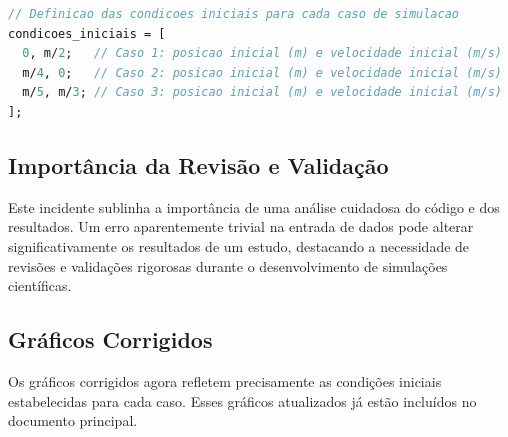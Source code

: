 \documentclass{article}
\begin{document}
\begin{lstlisting}[language=Scilab, caption=Condições iniciais corrigidas]
// Definicao das condicoes iniciais para cada caso de simulacao
condicoes_iniciais = [
  0, m/2;   // Caso 1: posicao inicial (m) e velocidade inicial (m/s)
  m/4, 0;   // Caso 2: posicao inicial (m) e velocidade inicial (m/s)
  m/5, m/3; // Caso 3: posicao inicial (m) e velocidade inicial (m/s)
];
\end{lstlisting}

\subsection{Importância da Revisão e Validação}

Este incidente sublinha a importância de uma análise cuidadosa do código e dos resultados. Um erro aparentemente trivial na entrada de dados pode alterar significativamente os resultados de um estudo, destacando a necessidade de revisões e validações rigorosas durante o desenvolvimento de simulações científicas.

\subsection{Gráficos Corrigidos}

Os gráficos corrigidos agora refletem precisamente as condições iniciais estabelecidas para cada caso. Esses gráficos atualizados já estão incluídos no documento principal.
\end{document}
